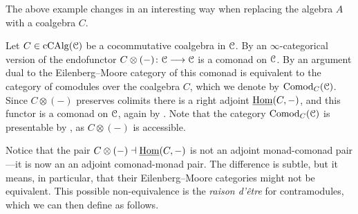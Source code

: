 The above example changes in an interesting way when replacing the algebra $A$ with a coalgebra $C$. 

\begin{example}
    \label{ch2:ex:coalgebra-comonad}
    Let $C\in \operatorname{cCAlg}(\EuScript{C})$ be a cocommutative coalgebra in $\EuScript{C}$. By an $\infty$-categorical version of \cite[2.5]{hristova-jones-rumynin_2023} the endofunctor $C\otimes(-)\colon\EuScript{C}\longrightarrow\EuScript{C}$ is a comonad on $\EuScript{C}$. By an argument dual to \cite[1.17]{christ_2023} the Eilenberg--Moore category of this comonad is equivalent to the category of comodules over the coalgebra $C$, which we denote by $\mathrm{Comod}_C(\EuScript{C})$. Since $C\otimes (-)$ preserves colimits there is a right adjoint $\operatorname{\underline{Hom}}(C,-)$, and this functor is a comonad on $\EuScript{C}$, again by \cite[2.5]{hristova-jones-rumynin_2023}. Note that the category $\mathrm{Comod}_C(\EuScript{C})$ is presentable by \cite[3.8]{ramzi_2024}, as $C\otimes (-)$ is accessible. 
\end{example}

Notice that the pair $C\otimes(-)\dashv \operatorname{\underline{Hom}}(C,-)$ is not an adjoint monad-comonad pair---it is now an an adjoint comonad-monad pair. The difference is subtle, but it means, in particular, that their Eilenberg--Moore categories might not be equivalent. This possible non-equivalence is the \emph{raison d'être} for contramodules, which we can then define as follows. 





